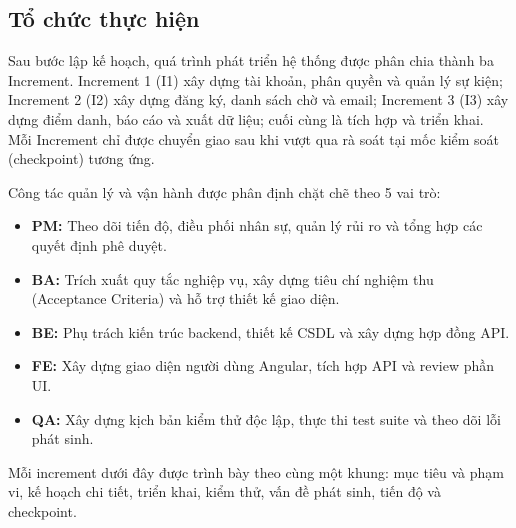 \subsection{Tổ chức thực hiện}
\label{sec:i1-organization}

Sau bước lập kế hoạch, quá trình phát triển hệ thống được phân chia thành ba Increment. Increment 1 (I1) xây dựng tài khoản, phân quyền và quản lý sự kiện; Increment 2 (I2) xây dựng đăng ký, danh sách chờ và email; Increment 3 (I3) xây dựng điểm danh, báo cáo và xuất dữ liệu; cuối cùng là tích hợp và triển khai. Mỗi Increment chỉ được chuyển giao sau khi vượt qua rà soát tại mốc kiểm soát (checkpoint) tương ứng.

Công tác quản lý và vận hành được phân định chặt chẽ theo 5 vai trò:
\begin{itemize}
    \item \textbf{PM:} Theo dõi tiến độ, điều phối nhân sự, quản lý rủi ro và tổng hợp các quyết định phê duyệt.
    \item \textbf{BA:} Trích xuất quy tắc nghiệp vụ, xây dựng tiêu chí nghiệm thu (Acceptance Criteria) và hỗ trợ thiết kế giao diện.
    \item \textbf{BE:} Phụ trách kiến trúc backend, thiết kế CSDL và xây dựng hợp đồng API.
    \item \textbf{FE:} Xây dựng giao diện người dùng Angular, tích hợp API và review phần UI.
    \item \textbf{QA:} Xây dựng kịch bản kiểm thử độc lập, thực thi test suite và theo dõi lỗi phát sinh.
\end{itemize}

Mỗi increment dưới đây được trình bày theo cùng một khung: mục tiêu và phạm vi, kế hoạch chi tiết, triển khai, kiểm thử, vấn đề phát sinh, tiến độ và checkpoint.
